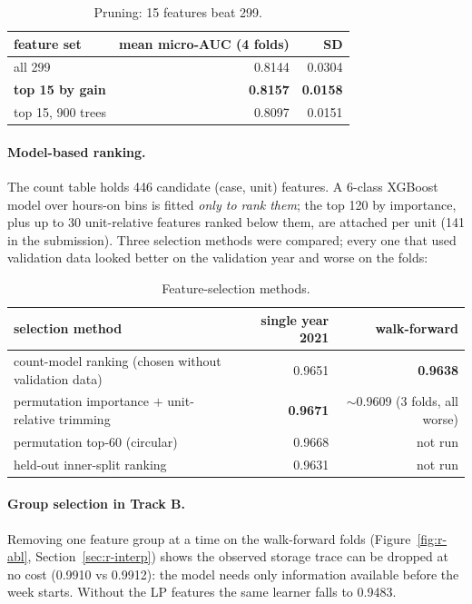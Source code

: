 \documentclass[11pt]{article}
\begin{document}
\begin{table}[H]
\centering\small
\begin{tabular}{lrr}
\toprule
feature set & mean micro-AUC (4 folds) & SD \\
\midrule
all 299 & 0.8144 & 0.0304 \\
\textbf{top 15 by gain} & \textbf{0.8157} & \textbf{0.0158} \\
top 15, 900 trees & 0.8097 & 0.0151 \\
\bottomrule
\end{tabular}
\caption{Pruning: 15 features beat 299.}
\end{table}

\paragraph{Model-based ranking.} The count table holds 446 candidate (case, unit)
features. A 6-class XGBoost model over hours-on bins is fitted \emph{only to rank them}; the top 120
by importance, plus up to 30 unit-relative features ranked below them, are attached per unit
(141 in the submission). Three selection methods were compared; every one that used validation data
looked better on the validation year and worse on the folds:

\begin{table}[H]
\centering\small
\begin{tabularx}{\linewidth}{Yrr}
\toprule
selection method & single year 2021 & walk-forward \\
\midrule
count-model ranking (chosen without validation data) & 0.9651 & \textbf{0.9638} \\
permutation importance $+$ unit-relative trimming & \textbf{0.9671} & $\sim$0.9609 (3 folds, all worse) \\
permutation top-60 (circular) & 0.9668 & not run \\
held-out inner-split ranking & 0.9631 & not run \\
\bottomrule
\end{tabularx}
\caption{Feature-selection methods.}
\end{table}

\paragraph{Group selection in Track B.} Removing one feature group at a time on the walk-forward
folds (Figure~\ref{fig:r-abl}, Section~\ref{sec:r-interp}) shows the observed storage trace can be
dropped at no cost (0.9910 vs 0.9912): the model needs only information available before the week
starts. Without the LP features the same learner falls to 0.9483.
\end{document}
